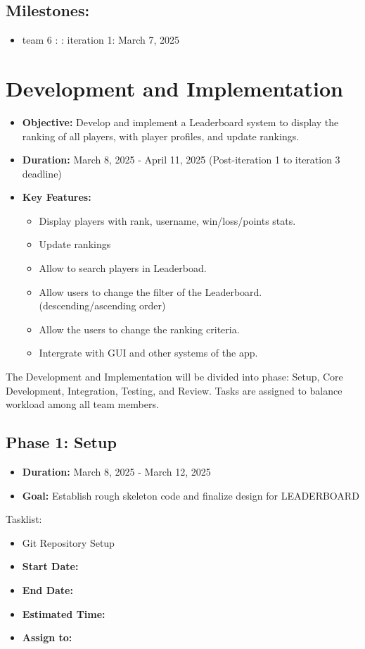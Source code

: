 \documentclass{report}
\begin{document}
\subsection*{Milestones:}
\begin{itemize}
    \item team 6 : : iteration 1: March 7, 2025
\end{itemize}
\section{Development and Implementation}
\begin{itemize}
    \item \textbf{Objective:} Develop and implement a Leaderboard system to display the ranking of all players, with player profiles, and update rankings.
    \item \textbf{Duration:} March 8, 2025 - April 11, 2025 (Post-iteration 1 to iteration 3 deadline)
    \item \textbf{Key Features:}
    \begin{itemize}
        \item Display players with rank, username, win/loss/points stats.
        \item Update rankings
        \item Allow to search players in Leaderboad.
        \item Allow users to change the filter of the Leaderboard. (descending/ascending order)
        \item Allow the users to change the ranking criteria.
        \item Intergrate with GUI and other systems of the app.
    \end{itemize}
\end{itemize}
The Development and Implementation will be divided into phase: Setup, Core Development, Integration, Testing, and Review. Tasks are assigned to balance workload among all team members.
\subsection*{Phase 1: Setup}
\begin{itemize}
    \item \textbf{Duration:} March 8, 2025 - March 12, 2025
    \item \textbf{Goal:} Establish rough skeleton code and finalize design for LEADERBOARD
\end{itemize}
Tasklist:
\begin{itemize}
    \item Git Repository Setup
    \item \textbf{Start Date:} 
    \item \textbf{End Date:}
    \item \textbf{Estimated Time:}
    \item \textbf{Assign to:}
\end{itemize}
\end{document}
